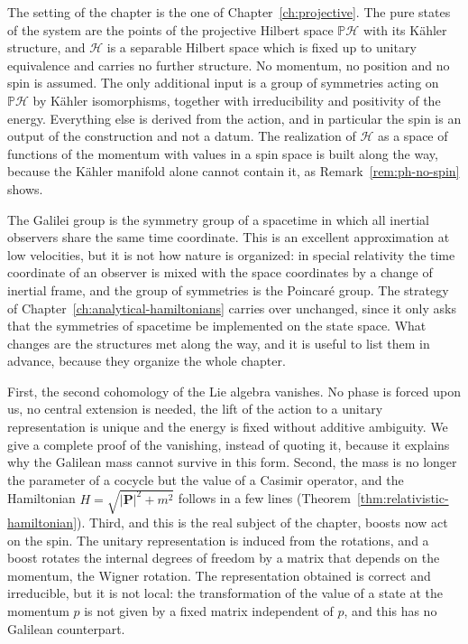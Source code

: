 	The setting of the chapter is the one of Chapter~\ref{ch:projective}. The pure states of the system are the points of the projective Hilbert space $\mathbb{P}\mathcal{H}$ with its Kähler structure, and $\mathcal{H}$ is a separable Hilbert space which is fixed up to unitary equivalence and carries no further structure. No momentum, no position and no spin is assumed. The only additional input is a group of symmetries acting on $\mathbb{P}\mathcal{H}$ by Kähler isomorphisms, together with irreducibility and positivity of the energy. Everything else is derived from the action, and in particular the spin is an output of the construction and not a datum. The realization of $\mathcal{H}$ as a space of functions of the momentum with values in a spin space is built along the way, because the Kähler manifold alone cannot contain it, as Remark~\ref{rem:ph-no-spin} shows.
	
	The Galilei group is the symmetry group of a spacetime in which all inertial observers share the same time coordinate. This is an excellent approximation at low velocities, but it is not how nature is organized: in special relativity the time coordinate of an observer is mixed with the space coordinates by a change of inertial frame, and the group of symmetries is the Poincar\'e group. The strategy of Chapter~\ref{ch:analytical-hamiltonians} carries over unchanged, since it only asks that the symmetries of spacetime be implemented on the state space. What changes are the structures met along the way, and it is useful to list them in advance, because they organize the whole chapter.
	
	First, the second cohomology of the Lie algebra vanishes. No phase is forced upon us, no central extension is needed, the lift of the action to a unitary representation is unique and the energy is fixed without additive ambiguity. We give a complete proof of the vanishing, instead of quoting it, because it explains why the Galilean mass cannot survive in this form. Second, the mass is no longer the parameter of a cocycle but the value of a Casimir operator, and the Hamiltonian $H=\sqrt{|\mathbf{P}|^2+m^2}$ follows in a few lines (Theorem~\ref{thm:relativistic-hamiltonian}). Third, and this is the real subject of the chapter, boosts now act on the spin. The unitary representation is induced from the rotations, and a boost rotates the internal degrees of freedom by a matrix that depends on the momentum, the Wigner rotation. The representation obtained is correct and irreducible, but it is not local: the transformation of the value of a state at the momentum $p$ is not given by a fixed matrix independent of $p$, and this has no Galilean counterpart.
	

